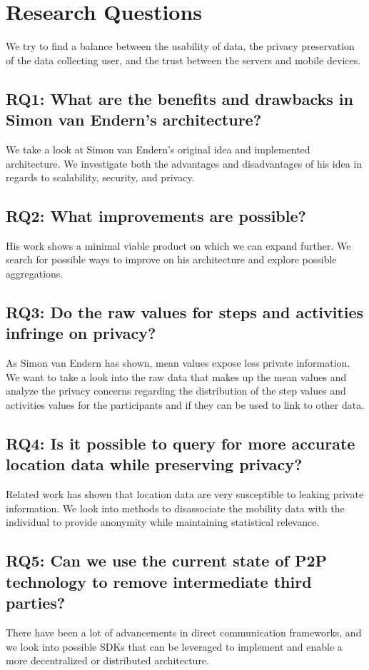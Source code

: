 \section{Research Questions}
We try to find a balance between the usability of data, the privacy preservation of the data collecting user, and the trust between the servers and mobile devices.
\subsection*{RQ1: What are the benefits and drawbacks in Simon van Endern's architecture?}
We take a look at Simon van Endern's original idea and implemented architecture. We investigate both the advantages and disadvantages of his idea in regards to scalability, security, and privacy.
\subsection*{RQ2: What improvements are possible?}
His work shows a minimal viable product on which we can expand further. We search for possible ways to improve on his architecture and explore possible aggregations.
\subsection*{RQ3: Do the raw values for steps and activities infringe on privacy?}
As Simon van Endern has shown, mean values expose less private information. We want to take a look into the raw data that makes up the mean values and analyze the privacy concerns regarding the distribution of the step values and activities values for the participants and if they can  be used to link to other data.
\subsection*{RQ4: Is it possible to query for more accurate location data while preserving privacy?}
Related work has shown that location data are very susceptible to leaking private information. We look into methods to disassociate the mobility data with the individual to provide anonymity while maintaining statistical relevance.
\subsection*{RQ5: Can we use the current state of P2P technology to remove intermediate third parties?}
There have been a lot of advancements in direct communication frameworks, and we look into possible SDKs that can be leveraged to implement and enable a more decentralized or distributed architecture.

